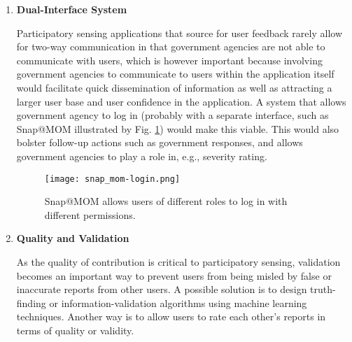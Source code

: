 \documentclass[conference,10pt]{IEEEtran}
\begin{document}
\begin{enumerate}[leftmargin=1.5em]
\item{\textbf{Dual-Interface System}} \par Participatory sensing applications that source for user feedback rarely allow for two-way communication in that government agencies are not able to communicate with users, which is however important because involving government agencies to communicate to users within the application itself would facilitate quick dissemination of information as well as attracting a larger user base and user confidence in the application.
A system that allows government agency to log in (probably with a separate interface, such as Snap@MOM illustrated by Fig. \ref{fig:snap-login}) would make this viable. This would also bolster follow-up actions such as government responses, and allows government agencies to play a role in, e.g., severity rating.
\begin{figure}[ht]
\centering
\texttt{[image: snap\_mom-login.png]}
\caption{Snap@MOM allows users of different roles to log in with different permissions.}
\label{fig:snap-login}
\end{figure}
\item{\textbf{Quality and Validation}} \par As the quality of contribution\cite{qcs13dcoss} is critical to participatory sensing, validation becomes an important way to prevent users from being misled by false or inaccurate reports from other users. A possible solution is to design truth-finding or information-validation algorithms using machine learning techniques. Another way is to allow users to rate each other's reports in terms of quality or validity.


\end{enumerate}
\end{document}
